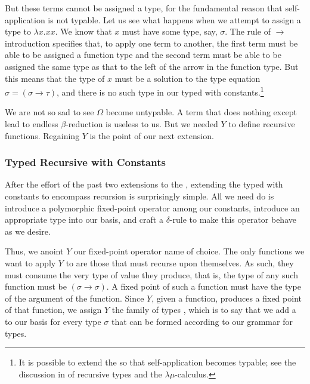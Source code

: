 But these terms cannot be assigned a type, for the fundamental reason that self-ap\-pli\-ca\-tion is not typable. Let us see what happens when we attempt to assign a type to $\lambda x. x x$. We know that $x$ must have some type, say, $\sigma$. The rule of $\to$ introduction specifies that, to apply one term to another, the first term must be able to be assigned a function type and the second term must be able to be assigned the same type as that to the left of the arrow in the function type. But this means that the type of $x$ must be a solution to the type equation $\sigma = (\sigma \to \tau)$, and there is no such type in our typed \lambdacalc with constants.\footnote{It is possible to extend the \lambdacalc so that self-ap\-pli\-ca\-tion becomes typable; see the discussion in \citet[\mbox{Section 3.2, pp. 14--17}]{Barendregt:Types:1990} of recursive types and the $\lambda \mu$-calculus.}

We are not so sad to see $\Omega$ become untypable. A term that does nothing except lead to endless $\beta$-re\-duc\-tion is useless to us. But we needed $Y$ to define recursive functions. Regaining $Y$ is the point of our next extension.

\subsubsection[Typed Recursive with Constants]{Typed Recursive \LambdaCalc with Constants}
After the effort of the past two extensions to the \lambdacalc, extending the typed \lambdacalc with constants to encompass recursion is surprisingly simple. All we need do is introduce a polymorphic fixed-point operator among our constants, introduce an appropriate type into our basis, and craft a $\delta$-rule to make this operator behave as we desire.

Thus, we anoint $Y$ our fixed-point operator name of choice. The only functions we want to apply $Y$ to are those that must recurse upon themselves. As such, they must consume the very type of value they produce, that is, the type of any such function must be $(\sigma \to \sigma)$. A fixed point of such a function must have the type of the argument of the function.  Since $Y$, given a function, produces a fixed point of that function, we assign $Y$ the family of types , which is to say that we add a  to our basis \basis{} for every type $\sigma$ that can be formed according to our grammar for types.

